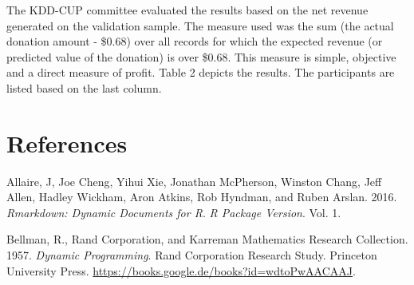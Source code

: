 \documentclass[
  11pt,
  a4paper,
  DIV=12,captions=tableheading,oneside]{scrbook}
\begin{document}
The KDD-CUP committee evaluated the results based on the net revenue generated on the validation sample.
The measure used was the sum (the actual donation amount - \$0.68) over all records for which the expected revenue (or predicted value of the donation) is over \$0.68.
This measure is simple, objective and a direct measure of profit. Table 2 depicts the results. The participants are listed based on the last column.

\begin{table}[!h]

\caption{\label{tab:benchmark-cup-winners}Top five of the KDD-CUP participants. N* denotes the number for which the predicted donation amount is > $0.68. Sum is the total profit, meaning the donation minus $0.68 for each example.}
\centering
{}
\end{table}

\hypertarget{references}{%
\chapter*{References}\label{references}}

\hypertarget{refs}{}
\leavevmode\hypertarget{ref-allaire2016rmarkdown}{}%
Allaire, J, Joe Cheng, Yihui Xie, Jonathan McPherson, Winston Chang, Jeff Allen, Hadley Wickham, Aron Atkins, Rob Hyndman, and Ruben Arslan. 2016. \emph{Rmarkdown: Dynamic Documents for R}. \emph{R Package Version}. Vol. 1.

\leavevmode\hypertarget{ref-bellman1957dynamic}{}%
Bellman, R., Rand Corporation, and Karreman Mathematics Research Collection. 1957. \emph{Dynamic Programming}. Rand Corporation Research Study. Princeton University Press. \url{https://books.google.de/books?id=wdtoPwAACAAJ}.
\end{document}
